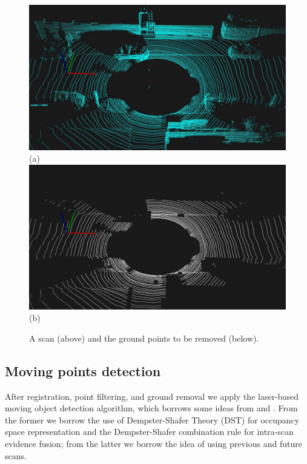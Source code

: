 \begin{figure}
\setlength{\tabcolsep}{1pt}
\begin{center}
\includegraphics[width=0.99\columnwidth]{./img/ch-laser/beforeGroundRemoval_smal} \\
(a)\\
\includegraphics[width=0.99\columnwidth]{./img/ch-laser/postGroundRemoval}\\
(b)
\end{center}
\caption{A scan (above) and the ground points to be removed (below).}
\label{fig:groundremoval}
\end{figure}

\subsection{Moving points detection}
After registration, point filtering, and ground removal we apply the laser-based moving object detection algorithm, which borrows some ideas from  \cite{xiao2013change} and \cite{vallet2015extracting}. From the former we borrow the use of Dempster-Shafer Theory (DST) for occupancy space representation and the Dempster-Shafer combination rule for intra-scan evidence fusion; from the latter we borrow the idea of using previous and future scans.

